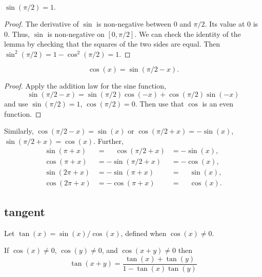 \begin{lemma}\label{lemma:sin-pi2}
    $\sin (\pi/2) = 1.$
\end{lemma}

\begin{proof}
The derivative of $\sin$ is non-negative between $0$ and $\pi/2$.
Its value at $0$ is $0$.  Thus, $\sin$ is non-negative on
$[0,\pi/2]$.  We can check the identity of the lemma by checking
that the squares of the two sides are equal. Then $\sin^2(\pi/2) =
{1-\cos^2(\pi/2)} = 1$.
\end{proof}

\begin{lemma}\label{lemma:cos-sin}
    $$\cos(x) = \sin(\pi/2 - x).$$
\end{lemma}

\begin{proof}
    Apply the addition law for the sine function,
    $$\sin(\pi/2 - x) = \sin(\pi/2)\cos(-x) + \cos(\pi/2)\sin(-x)$$
    and use
    $\sin(\pi/2) = 1$, $\cos(\pi/2) = 0$.  Then use that $\cos$ is
    an even function.
\end{proof}

Similarly,%
%
$\cos(\pi/2 - x) = \sin(x)$ or $\cos(\pi/2 + x) =
-\sin(x)$, $\sin(\pi/2 + x) = \cos(x)$.  Further,
    $$\begin{array}{lll}
      \sin(\pi + x) &= \phantom{-}\cos(\pi/2 + x) &= -\sin(x),\\
      \cos(\pi + x) &= -\sin(\pi/2 + x) &= -\cos(x),\\
      \sin(2\pi + x) &= -\sin(\pi + x) &= \phantom{-}\sin(x),\\
      \cos(2\pi + x) &= -\cos(\pi + x) &= \phantom{-}\cos(x).
      \end{array}$$


\subsection{tangent}
\label{sec:tangent}

\begin{definition}[tangent]\label{def:tan}
Let $\tan(x) = \sin(x)/\cos(x)$, defined when $\cos(x)\ne0$.
\end{definition}


\begin{lemma}\label{lemma:tan-add}
    If $\cos(x)\ne 0$, $\cos(y)\ne 0$, and $\cos(x+y)\ne0$ then
    $$\tan(x+y) = \frac{\tan(x) + \tan(y) }{ 1 - \tan(x)\tan(y)}$$
\end{lemma}

